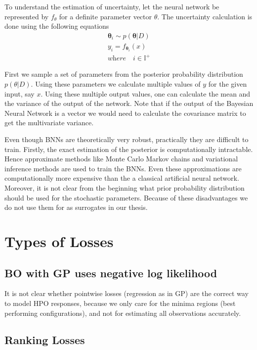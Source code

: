 \documentclass[12pt, twoside, ngerman]{report}
\begin{document}
To understand the estimation of uncertainty,  let the neural network be represented by $f_{\theta}$ for a definite parameter vector $\theta$. 
The uncertainty calculation is done using the following equations
\begin{align*}
\mathbf{\theta}_i \sim p(\mathbf{\theta}| D)  \\
y_i = f_{\mathbf{\theta}_i}(x) \\
\textit{where} \quad i \in \mathbb{I}^+
\end{align*}

First we sample a set of parameters from the posterior probability distribution $p(\theta | D)$.
Using these parameters we calculate multiple values of $y$ for the given input, say $x$.
Using these multiple output values,  one can calculate the mean and the variance of the output of the network.
Note that if the output of the Bayesian Neural Network is a vector we would need to calculate the covariance matrix to get the multivariate variance.

Even though BNNs are theoretically very robust,  practically they are difficult to train.
Firstly,  the exact estimation of the posterior is computationally intractable.
Hence approximate methods like Monte Carlo Markov chains and variational inference methods are used to train the BNNs.
Even these approximations are computationally more expensive than the a classical artificial neural network.
Moreover,  it is not clear from the beginning what prior probability distribution should be used  for the stochastic parameters.
Because of these disadvantages we do not use them for as surrogates in our thesis.

\section{Types of Losses}
\subsection{BO with GP uses negative log likelihood}
It is not clear whether pointwise losses (regression as in GP) are the correct way to model HPO responses, because we only care for the minima regions (best performing configurations), and not for estimating all observations accurately.


\subsection{Ranking Losses}\label{sec:ranklearning}
\end{document}
